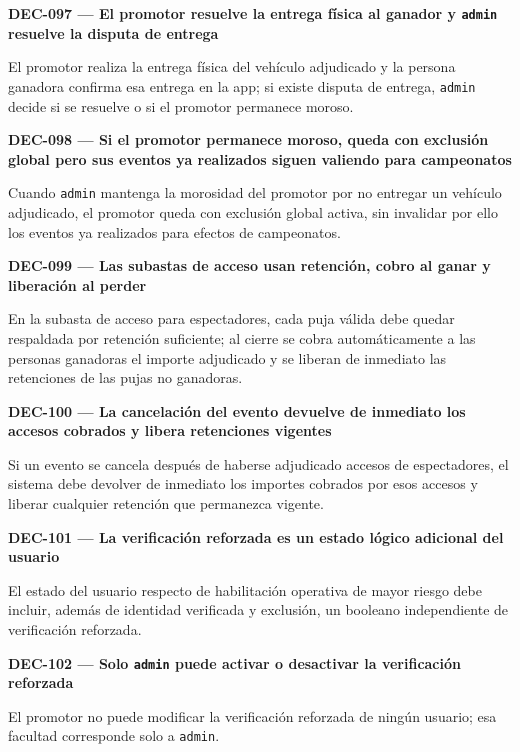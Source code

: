 \documentclass[10pt,letterpaper]{article}
\begin{document}
\noindent\textbf{DEC-097 --- El promotor resuelve la entrega física al ganador y \texttt{admin} resuelve la disputa de entrega}\par
El promotor realiza la entrega física del vehículo adjudicado y la persona ganadora confirma esa entrega en la app; si existe disputa de entrega, \texttt{admin} decide si se resuelve o si el promotor permanece moroso.\par\vspace{0.45em}
\noindent\textbf{DEC-098 --- Si el promotor permanece moroso, queda con exclusión global pero sus eventos ya realizados siguen valiendo para campeonatos}\par
Cuando \texttt{admin} mantenga la morosidad del promotor por no entregar un vehículo adjudicado, el promotor queda con exclusión global activa, sin invalidar por ello los eventos ya realizados para efectos de campeonatos.\par\vspace{0.45em}
\noindent\textbf{DEC-099 --- Las subastas de acceso usan retención, cobro al ganar y liberación al perder}\par
En la subasta de acceso para espectadores, cada puja válida debe quedar respaldada por retención suficiente; al cierre se cobra automáticamente a las personas ganadoras el importe adjudicado y se liberan de inmediato las retenciones de las pujas no ganadoras.\par\vspace{0.45em}
\noindent\textbf{DEC-100 --- La cancelación del evento devuelve de inmediato los accesos cobrados y libera retenciones vigentes}\par
Si un evento se cancela después de haberse adjudicado accesos de espectadores, el sistema debe devolver de inmediato los importes cobrados por esos accesos y liberar cualquier retención que permanezca vigente.\par\vspace{0.45em}
\noindent\textbf{DEC-101 --- La verificación reforzada es un estado lógico adicional del usuario}\par
El estado del usuario respecto de habilitación operativa de mayor riesgo debe incluir, además de identidad verificada y exclusión, un booleano independiente de verificación reforzada.\par\vspace{0.45em}
\noindent\textbf{DEC-102 --- Solo \texttt{admin} puede activar o desactivar la verificación reforzada}\par
El promotor no puede modificar la verificación reforzada de ningún usuario; esa facultad corresponde solo a \texttt{admin}.\par\vspace{0.45em}
\end{document}
